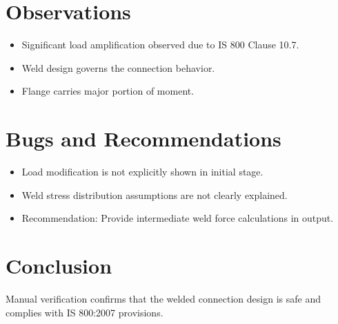 \section{Observations}
\begin{itemize}
    \item Significant load amplification observed due to IS 800 Clause 10.7.
    \item Weld design governs the connection behavior.
    \item Flange carries major portion of moment.
\end{itemize}

\section{Bugs and Recommendations}
\begin{itemize}
    \item Load modification is not explicitly shown in initial stage.
    \item Weld stress distribution assumptions are not clearly explained.
    \item Recommendation: Provide intermediate weld force calculations in output.
\end{itemize}

\section{Conclusion}
Manual verification confirms that the welded connection design is safe and complies with IS 800:2007 provisions.

